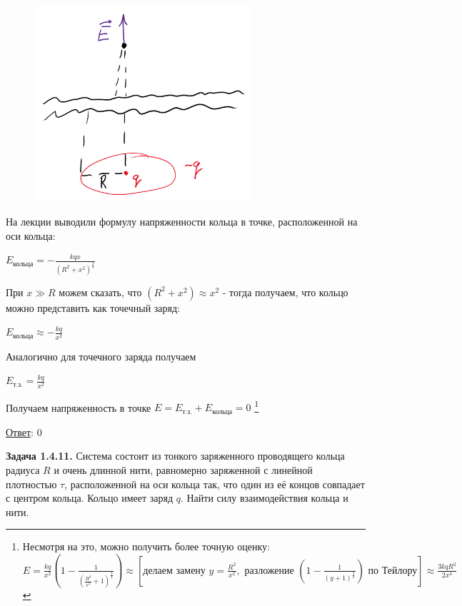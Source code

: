 \documentclass[12pt]{article}
\begin{document}
\begin{minipage}{\textwidth}
    \begin{figure}
        \includegraphics[width=8cm]{physics1/images/physics1_homework_6_2}
    \end{figure}

    На лекции выводили формулу напряженности кольца в точке, расположенной на оси кольца: 

    $E_{\text{кольца}} = -\frac{kqx}{(R^2 + x^2)^{\frac{3}{2}}}$

    При $x \gg R$ можем сказать, что $(R^2 + x^2) \approx x^2$ - тогда получаем, что кольцо можно представить как точечный заряд:

    $E_{\text{кольца}} \approx -\frac{kq}{x^2}$

    Аналогично для точечного заряда получаем 
    
    $E_{\text{т.з.}} = \frac{kq}{x^2}$
\end{minipage}

Получаем напряженность в точке $E = E_{\text{т.з.}} + E_{\text{кольца}} = 0$
\footnote{Несмотря на это, можно получить более точную оценку: \\
$E = \frac{kq}{x^2} \left(1 - \frac{1}{\left(\frac{R^2}{x^2} + 1\right)^{\frac{3}{2}}}\right) \approx \left[\text{делаем замену } y = \frac{R^2}{x^2}, \text{ разложение } \left(1 - \frac{1}{(y + 1)^{\frac{3}{2}}}\right) \text{ по Тейлору}\right] \approx \frac{3kqR^2}{2x^4}$}

\underline{Ответ}: 0

\clearpage

\begin{tcolorbox}
    \textbf{Задача 1.4.11.} Система состоит из тонкого заряженного
    проводящего кольца радиуса $R$ и очень длинной нити, равномерно
    заряженной с линейной плотностью $\tau$, расположенной на оси
    кольца так, что один из её концов совпадает с центром кольца.
    Кольцо имеет заряд $q$. Найти силу взаимодействия кольца и нити.
\end{tcolorbox}
\end{document}
